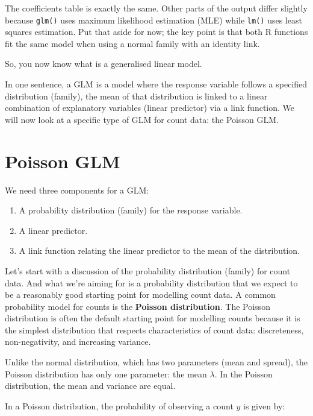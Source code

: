 \documentclass[
  letterpaper,
  8pt,
  a4paper]{book}
\providecommand{\tightlist}{%
  \setlength{\itemsep}{0pt}\setlength{\parskip}{0pt}}
\begin{document}
The coefficients table is exactly the same. Other parts of the output
differ slightly because \texttt{glm()} uses maximum likelihood
estimation (MLE) while \texttt{lm()} uses least squares estimation. Put
that aside for now; the key point is that both R functions fit the same
model when using a normal family with an identity link.

So, you now know what is a generalised linear model.

In one sentence, a GLM is a model where the response variable follows a
specified distribution (family), the mean of that distribution is linked
to a linear combination of explanatory variables (linear predictor) via
a link function. We will now look at a specific type of GLM for count
data: the Poisson GLM.

\section*{Poisson GLM}\label{poisson-glm}


We need three components for a GLM:

\begin{enumerate}
\def\labelenumi{\arabic{enumi}.}
\tightlist
\item
  A probability distribution (family) for the response variable.
\item
  A linear predictor.
\item
  A link function relating the linear predictor to the mean of the
  distribution.
\end{enumerate}

Let's start with a discussion of the probability distribution (family)
for count data. And what we're aiming for is a probability distribution
that we expect to be a reasonably good starting point for modelling
count data. A common probability model for counts is the \textbf{Poisson
distribution}. The Poisson distribution is often the default starting
point for modelling counts because it is the simplest distribution that
respects characteristics of count data: discreteness, non-negativity,
and increasing variance.

Unlike the normal distribution, which has two parameters (mean and
spread), the Poisson distribution has only one parameter: the mean
\(\lambda\). In the Poisson distribution, the mean and variance are
equal.

In a Poisson distribution, the probability of observing a count \(y\) is
given by:
\end{document}
